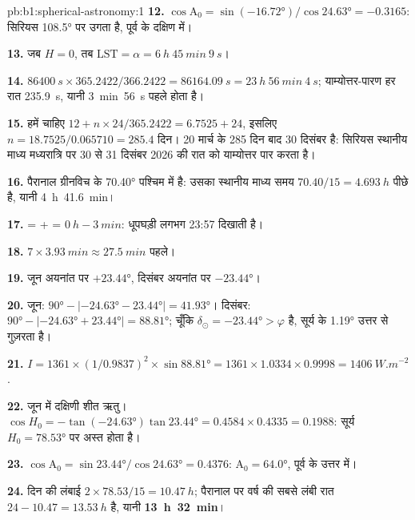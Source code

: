 \begin{solution}{pb:b1:spherical-astronomy:1}
\textbf{12.} $\cos\mathrm{A}_0 = \sin(\ang{-16.72})/\cos\ang{24.63} =
-0.3165$: सिरियस  \ang{108.5} पर उगता है, पूर्व के दक्षिण में।

\textbf{13.} जब $H = 0$, तब $\mathrm{LST} = \alpha = \qty{6}{h}~\qty{45}{min}~\qty{9}{s}$।

\textbf{14.} $\qty{86400}{s}\times365.2422/366.2422 = \qty{86164.09}{s} =
\qty{23}{h}~\qty{56}{min}~\qty{4}{s}$; याम्योत्तर-पारण हर रात
\qty{235.9}{s}, यानी \qty{3}{min}~\qty{56}{s} पहले होता है।

\textbf{15.} हमें चाहिए $12 + n\times24/365.2422 = 6.7525 + 24$, इसलिए
$n = 18.7525/0.065710 = 285.4$ दिन। 20 मार्च के 285 दिन बाद 30 दिसंबर है: सिरियस स्थानीय
माध्य मध्यरात्रि पर 30 से 31 दिसंबर 2026 की रात को याम्योत्तर पार करता है।

\textbf{16.} पैरानाल ग्रीनविच के \ang{70.40} पश्चिम में है: उसका स्थानीय माध्य समय
$70.40/15 = \qty{4.693}{h}$ पीछे है, यानी \qty{4}{h}~\qty{41.6}{min}।

\textbf{17.}  =  +  =
$\qty{0}{h} - \qty{3}{min}$: धूपघड़ी लगभग 23:57 दिखाती है।

\textbf{18.} $7\times\qty{3.93}{min} \approx \qty{27.5}{min}$ पहले।

\textbf{19.} जून अयनांत पर $+\ang{23.44}$, दिसंबर
अयनांत पर $-\ang{23.44}$।

\textbf{20.} जून: $\ang{90} - |\ang{-24.63} - \ang{23.44}| = \ang{41.93}$।
दिसंबर: $\ang{90} - |\ang{-24.63} + \ang{23.44}| = \ang{88.81}$; चूँकि
$\delta_\odot = \ang{-23.44} > \varphi$ है, सूर्य  के \ang{1.19} उत्तर से गुज़रता है।

\textbf{21.} $I = 1361\times(1/0.9837)^2\times\sin\ang{88.81} = 1361\times
1.0334\times0.9998 = \qty{1406}{W.m^{-2}}$.

\textbf{22.} जून में दक्षिणी शीत ऋतु। $\cos H_0 = -\tan(\ang{-24.63})
\tan\ang{23.44} = 0.4584\times0.4335 = 0.1988$: सूर्य 
$H_0 = \ang{78.53}$ पर अस्त होता है।

\textbf{23.} $\cos\mathrm{A}_0 = \sin\ang{23.44}/\cos\ang{24.63} = 0.4376$:
$\mathrm{A}_0 = \ang{64.0}$, पूर्व के उत्तर में।

\textbf{24.} दिन की लंबाई $2\times78.53/15 = \qty{10.47}{h}$; पैरानाल पर वर्ष की सबसे लंबी रात
$24 - 10.47 = \qty{13.53}{h}$ है, यानी
\textbf{\qty[text-series-to-math=true]{13}{h}~\qty[text-series-to-math=true]{32}{min}}।
\end{solution}
